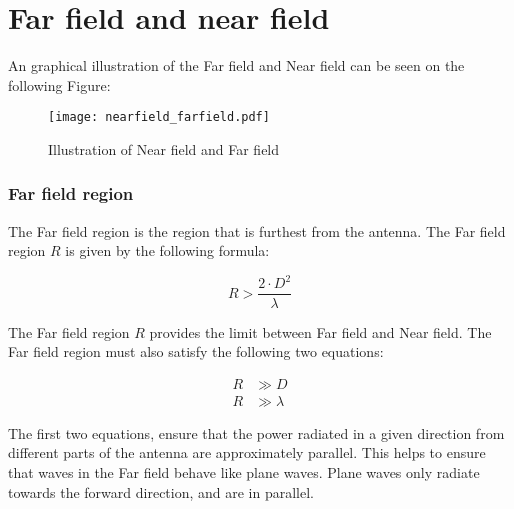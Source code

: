 \chapter{Far field and near field}

An graphical illustration of the Far field and Near field \citep{farnear_field1}\citep{farnear_field2} can be seen on the following Figure:

\begin{figure}[H]
\centering
\texttt{[image: nearfield\_farfield.pdf]}
\caption{Illustration of Near field and Far field \citep{farnear_field}}
\label{para_wave}
\end{figure}



\subsection{Far field region}

The Far field region is the region that is furthest from the antenna. The Far field region $R$ is given by the following formula:

\begin{equation}
R > \frac{2 \cdot D^{2}}{\lambda}
\label{far_field_eq1}
\end{equation}

\begin{where}
\end{where}

The Far field region $R$ provides the limit between Far field and Near field. The Far field region must also satisfy the following two equations:

\begin{align}
R &\gg D\\
R &\gg \lambda
\label{far_eq1_eq2}
\end{align}

The first two equations, ensure that the power radiated in a given direction from different parts of the antenna are approximately parallel. This helps to ensure that waves in the Far field behave like plane waves. Plane waves only radiate towards the forward direction, and are in parallel. %


